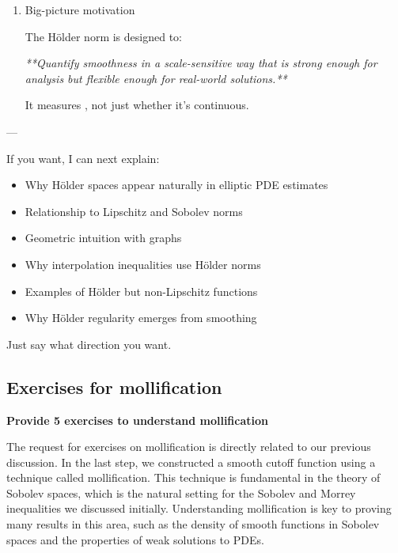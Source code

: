 \documentclass[12pt,a4paper]{report}
\begin{document}
\begin{description}
\begin{enumerate}
\begin{itemize}
Hölder bounds prevent wild oscillations → convergence control.

\item Interpolation

They bridge spaces of different smoothness.

\item Fractional smoothness

They anticipate Sobolev and Besov scale ideas.

\end{itemize}
---

\item Big-picture motivation

The Hölder norm is designed to:

\textit{**Quantify smoothness in a scale-sensitive way that is strong enough for analysis but flexible enough for real-world solutions.**}

It measures , not just whether it’s continuous.
\end{enumerate}

---

If you want, I can next explain:

\begin{itemize}

\item Why Hölder spaces appear naturally in elliptic PDE estimates
\item Relationship to Lipschitz and Sobolev norms
\item Geometric intuition with graphs
\item Why interpolation inequalities use Hölder norms
\item Examples of Hölder but non-Lipschitz functions
\item Why Hölder regularity emerges from smoothing

\end{itemize}
Just say what direction you want.

\newpage
\subsection*{Exercises for mollification}
\item \textbf{Provide 5 exercises to understand mollification}

The request for exercises on mollification is directly related to our previous discussion. In the last step, we constructed a smooth cutoff function using a technique called mollification. This technique is fundamental in the theory of Sobolev spaces, which is the natural setting for the Sobolev and Morrey inequalities we discussed initially. Understanding mollification is key to proving many results in this area, such as the density of smooth functions in Sobolev spaces and the properties of weak solutions to PDEs.


\end{description}
\end{document}
